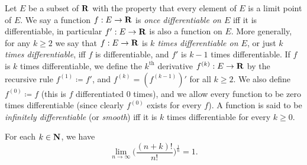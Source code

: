 \begin{definition}\label{4.2.4}
    Let \(E\) be a subset of \(\mathbf{R}\) with the property that every element of \(E\) is a limit point of \(E\).
    We say a function \(f : E \to \mathbf{R}\) is \emph{once differentiable on \(E\)} iff it is differentiable, in particular \(f': E \to \mathbf{R}\) is also a function on \(E\).
    More generally, for any \(k \geq 2\) we say that \(f : E \to \mathbf{R}\) is \emph{\(k\) times differentiable on \(E\)}, or just \emph{\(k\) times differentiable}, iff \(f\) is differentiable, and \(f'\) is \(k - 1\) times differentiable.
    If \(f\) is \(k\) times differentiable, we define the \(k^{\text{th}}\) derivative \(f^{(k)} : E \to \mathbf{R}\) by the recursive rule \(f^{(1)} \coloneqq f'\), and \(f^{(k)} = (f^{(k - 1)})'\) for all \(k \geq 2\).
    We also define \(f^{(0)} \coloneqq f\) (this is \(f\) differentiated \(0\) times), and we allow every function to be zero times differentiable (since clearly \(f^{(0)}\) exists for every \(f\)).
    A function is said to be \emph{infinitely differentiable} (or \emph{smooth}) iff it is \(k\) times differentiable for every \(k \geq 0\).
\end{definition}

\begin{additional corollary}\label{ac 4.2.1}
For each \(k \in \mathbf{N}\), we have
\[
    \lim_{n \to \infty} \bigg(\frac{(n + k)!}{n!}\bigg)^{\frac{1}{n}} = 1.
\]
\end{additional corollary}

